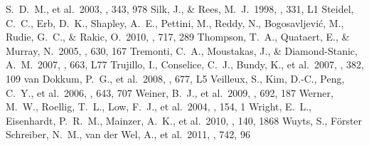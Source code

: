 \documentclass[apj]{emulateapj}
\begin{document}
\begin{thebibliography}{}
  S.~D.~M., et al.\ 2003, \mnras, 343, 978
 Silk, J., \& Rees, M.~J.\ 1998,
  \aap, 331, L1
 Steidel, C.~C., Erb, D.~K.,
  Shapley, A.~E., Pettini, M., Reddy, N., Bogosavljevi{\'c}, M.,
  Rudie, G.~C., \& Rakic, O.\ 2010, \apj, 717, 289
 Thompson, T.~A., Quataert, E.,
  \& Murray, N.\ 2005, \apj, 630, 167
 Tremonti, C.~A., Moustakas, J.,
  \& Diamond-Stanic, A.~M.\ 2007, \apjl, 663, L77
 Trujillo, I., Conselice, C.~J.,
  Bundy, K., et al.\ 2007, \mnras, 382, 109
 van Dokkum, P.~G., et
  al.\ 2008, \apjl, 677, L5
 Veilleux, S., Kim, D.-C., Peng,
  C.~Y., et al.\ 2006, \apj, 643, 707
 Weiner, B.~J., et al.\ 2009,
  \apj, 692, 187
 Werner, M.~W., Roellig, T.~L.,
  Low, F.~J., et al.\ 2004, \apjs, 154, 1
 Wright, E.~L., Eisenhardt,
  P.~R.~M., Mainzer, A.~K., et al.\ 2010, \aj, 140, 1868
 Wuyts, S., F{\"o}rster Schreiber,
  N.~M., van der Wel, A., et al.\ 2011, \apj, 742, 96
\end{thebibliography}
\end{document}
